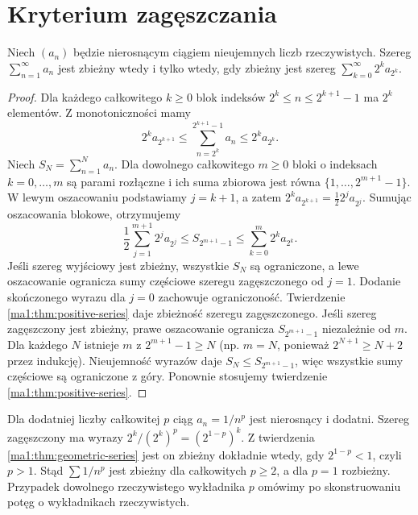 \section{Kryterium zagęszczania}
\begin{twierdzenie}
\label{ma1:thm:condensation}
Niech $(a_n)$ będzie nierosnącym ciągiem nieujemnych liczb rzeczywistych. Szereg $\sum_{n=1}^\infty a_n$ jest zbieżny wtedy i tylko wtedy, gdy zbieżny jest szereg $\sum_{k=0}^\infty 2^k a_{2^k}$.
\end{twierdzenie}
\begin{proof}
Dla każdego całkowitego $k\ge0$ blok indeksów $2^k\le n\le2^{k+1}-1$ ma $2^k$ elementów. Z monotoniczności mamy
\[
 2^k a_{2^{k+1}}\le
 \sum_{n=2^k}^{2^{k+1}-1}a_n
 \le 2^k a_{2^k}.
\]
Niech $S_N=\sum_{n=1}^N a_n$. Dla dowolnego całkowitego $m\ge0$ bloki o indeksach $k=0,\ldots,m$ są parami rozłączne i ich suma zbiorowa jest równa $\{1,\ldots,2^{m+1}-1\}$. W lewym oszacowaniu podstawiamy $j=k+1$, a zatem $2^k a_{2^{k+1}}=\frac12 2^j a_{2^j}$. Sumując oszacowania blokowe, otrzymujemy
\[
 \frac12\sum_{j=1}^{m+1}2^j a_{2^j}
 \le S_{2^{m+1}-1}
 \le\sum_{k=0}^{m}2^k a_{2^k}.
\]
Jeśli szereg wyjściowy jest zbieżny, wszystkie $S_N$ są ograniczone, a lewe oszacowanie ogranicza sumy częściowe szeregu zagęszczonego od $j=1$. Dodanie skończonego wyrazu dla $j=0$ zachowuje ograniczoność. Twierdzenie \ref{ma1:thm:positive-series} daje zbieżność szeregu zagęszczonego.
Jeśli szereg zagęszczony jest zbieżny, prawe oszacowanie ogranicza $S_{2^{m+1}-1}$ niezależnie od $m$. Dla każdego $N$ istnieje $m$ z $2^{m+1}-1\ge N$ (np. $m=N$, ponieważ $2^{N+1}\ge N+2$ przez indukcję). Nieujemność wyrazów daje $S_N\le S_{2^{m+1}-1}$, więc wszystkie sumy częściowe są ograniczone z góry. Ponownie stosujemy twierdzenie \ref{ma1:thm:positive-series}.
\end{proof}

\begin{przyklad}
\label{ma1:ex:integer-p-series}
Dla dodatniej liczby całkowitej $p$ ciąg $a_n=1/n^p$ jest nierosnący i dodatni. Szereg zagęszczony ma wyrazy $2^k/(2^k)^p=(2^{1-p})^k$. Z twierdzenia \ref{ma1:thm:geometric-series} jest on zbieżny dokładnie wtedy, gdy $2^{1-p}<1$, czyli $p>1$. Stąd $\sum 1/n^p$ jest zbieżny dla całkowitych $p\ge2$, a dla $p=1$ rozbieżny. Przypadek dowolnego rzeczywistego wykładnika $p$ omówimy po skonstruowaniu potęg o wykładnikach rzeczywistych.
\end{przyklad}

